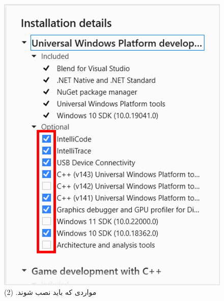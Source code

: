 {\begin{spacing}{1.5}
\begin{figure}[H]
            \includegraphics[scale=0.6]{Images/3/3.Intro.3.4}
            \caption*{مواردی که باید نصب شوند. (2)}
        \end{figure}
    \end{spacing}
}

\textbf{\vspace{-30pt}}
\title{
    \LARGE
}
\textbf{\vspace{-10pt}}

